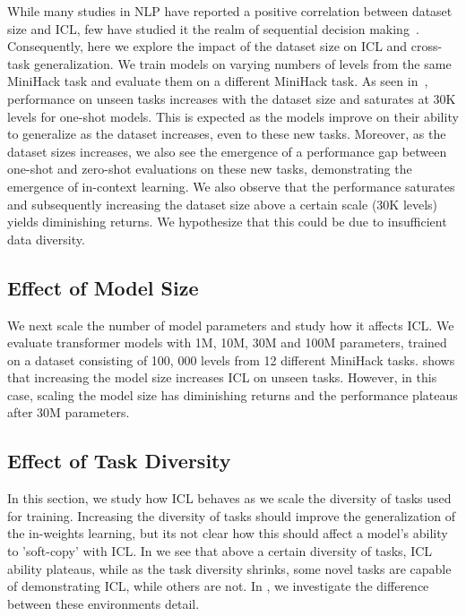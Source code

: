 \documentclass[]{fairmeta}
\begin{document}
 While many studies in NLP \citep{gpt3, scaling-laws, olsson2022incontext} have reported a positive correlation between dataset size and ICL, few have studied it the realm of sequential decision making~\citep{adaptiveagentteam2023humantimescale}. Consequently, here we explore the impact of the dataset size on ICL and cross-task generalization.  We train models on varying numbers of levels from the same MiniHack task and evaluate them on a different MiniHack task. As seen in~, performance on unseen tasks increases with the dataset size and saturates at 30K levels for one-shot models.  This is expected as the models improve on their ability to generalize as the dataset increases, even to these new tasks. Moreover, as the dataset sizes increases, we also see the emergence of a performance gap between one-shot and zero-shot evaluations on these new tasks, demonstrating the emergence of in-context learning. We also observe  that the performance saturates and subsequently increasing the dataset size above a certain scale (30K levels) yields diminishing returns. We hypothesize that this could be due to insufficient data diversity.
\subsection{Effect of Model Size} We next scale the number of model parameters and study how it affects ICL. We evaluate transformer models with 1M, 10M, 30M and 100M parameters, trained on a dataset consisting of 100, 000 levels from 12 different MiniHack tasks.  shows that increasing the model size increases ICL on unseen tasks. However, in this case, scaling the model size has diminishing returns and the performance plateaus after 30M parameters.
\subsection{Effect of Task Diversity} In this section, we study how ICL behaves as we scale the diversity of tasks used for training. Increasing the diversity of tasks should improve the generalization of the in-weights learning, but its not clear how this should affect a model's ability to 'soft-copy' with ICL.  In  we see that above a certain diversity of tasks, ICL ability plateaus, while as the task diversity shrinks, some novel tasks are capable of demonstrating ICL, while others are not.  In , we investigate the difference between these environments detail.
\end{document}
